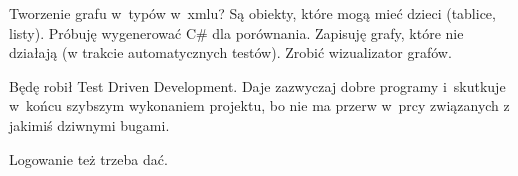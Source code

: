 Tworzenie grafu w~typów w~xmlu? Są obiekty, które mogą mieć dzieci (tablice, listy). Próbuję wygenerować C\# dla porównania. Zapisuję grafy, które nie działają (w trakcie automatycznych testów). Zrobić wizualizator grafów.

Będę robił Test Driven Development. Daje zazwyczaj dobre programy i~skutkuje w~końcu szybszym wykonaniem projektu, bo nie ma przerw w~prcy związanych z jakimiś dziwnymi bugami.

Logowanie też trzeba dać.

%
%
%
%
